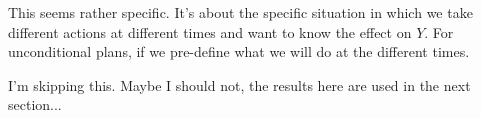 This seems rather specific. It's about the specific situation in which we take different actions at different times and want to know the effect on $Y$. For unconditional plans, if we pre-define what we will do at the different times.

I'm skipping this. Maybe I should not, the results here are used in the next section...
